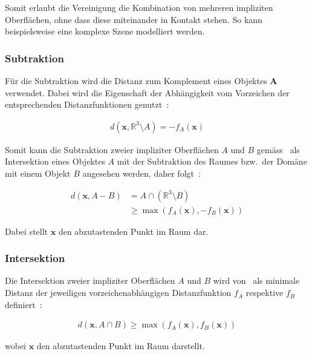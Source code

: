 Somit erlaubt die Vereinigung die Kombination von mehreren impliziten
Oberflächen, ohne dass diese miteinander in Kontakt stehen. So kann
beispielsweise eine komplexe Szene modelliert werden.


\subsubsection{Subtraktion}
\label{ssubsec:implicit_surfaces_ops_subtraction}

Für die Subtraktion wird die Distanz zum Komplement eines Objektes
$\bm{A}$ verwendet. Dabei wird die Eigenschaft der Abhängigkeit vom 
Vorzeichen der entsprechenden Distanzfunktionen genutzt~\parencite[S.
532]{hart_sphere_1994}:

\begin{gather}
    d(\bm{x}, \mathbb{R}^{3} \setminus A) = -f_{A}(\bm{x})
\end{gather}

Somit kann die Subtraktion zweier impliziter Oberflächen $A$ und $B$
gemäss~\citeauthor{hart_sphere_1994} als Intersektion eines Objektes $A$ mit der
Subtraktion des Raumes bzw.\ der Domäne mit einem Objekt $B$ angesehen werden,
daher folgt~\parencite[S. 532]{hart_sphere_1994}:

\begin{align}
    d(\bm{x}, A - B) &= A \cap (\mathbb{R}^{3} \setminus B) \\
                     &\geq \max(f_{A}(\bm{x}), -f_{B}(\bm{x}))
\end{align}

Dabei stellt $\bm{x}$ den abzutastenden Punkt im Raum dar.


\subsubsection{Intersektion}
\label{ssubsec:implicit_surfaces_ops_intersection}

Die Intersektion zweier impliziter Oberflächen $A$ und $B$ wird
von~\cite{hart_sphere_1994} als minimale Distanz der jeweiligen
vorzeichenabhängigen  Distanzfunktion $f_{A}$ respektive $f_{B}$
definiert~\parencite[S. 532]{hart_sphere_1994}:

\begin{gather}
    d(\bm{x}, A \cap B) \geq \max(f_{A}(\bm{x}), f_{B}(\bm{x}))
\end{gather}

wobei $\bm{x}$ den abzutastenden Punkt im Raum darstellt.
